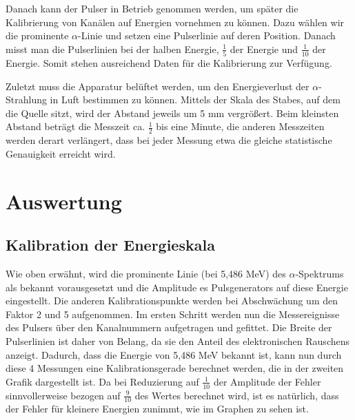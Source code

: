 \documentclass[bigchapter,colorback,accentcolor=tud4b,linedtoc,11pt]{tudreport}
\begin{document}
Danach kann der Pulser in Betrieb genommen werden, um später die Kalibrierung von Kanälen auf Energien vornehmen zu können. Dazu wählen wir die prominente $\alpha$-Linie und setzen eine Pulserlinie auf deren Position. Danach misst man die Pulserlinien bei der halben Energie, $\frac{1}{5}$ der Energie und $\frac{1}{10}$ der Energie. Somit stehen ausreichend Daten für die Kalibrierung zur Verfügung. 

Zuletzt muss die Apparatur belüftet werden, um den Energieverlust der $\alpha$-Strahlung in Luft bestimmen zu können. Mittels der Skala des Stabes, auf dem die Quelle sitzt, wird der Abstand jeweils um 5 mm vergrößert. Beim kleinsten Abstand beträgt die Messzeit ca. $\frac{1}{2}$ bis eine Minute, die anderen Messzeiten werden derart verlängert, dass bei jeder Messung etwa die gleiche statistische Genauigkeit erreicht wird. 

\chapter{Auswertung}

\section{Kalibration der Energieskala}

Wie oben erwähnt, wird die prominente Linie (bei 5,486 MeV) des
$\alpha$-Spektrums als bekannt vorausgesetzt und die Amplitude es Pulsgenerators
auf diese Energie eingestellt. Die anderen Kalibrationspunkte werden bei
Abschwächung um den Faktor 2 und 5 aufgenommen. Im ersten Schritt werden nun die
Messereignisse des Pulsers über den Kanalnummern aufgetragen und gefittet. Die
Breite der Pulserlinien ist daher von Belang, da sie den Anteil des
elektronischen Rauschens anzeigt. Dadurch, dass die Energie von 5,486 MeV
bekannt ist, kann nun durch diese 4 Messungen eine Kalibrationsgerade berechnet
werden, die in der zweiten Grafik dargestellt ist. Da bei Reduzierung auf
$\frac{1}{10}$ der Amplitude der Fehler sinnvollerweise bezogen auf
$\frac{9}{10}$ des Wertes berechnet wird, ist es natürlich, dass der Fehler für
kleinere Energien zunimmt, wie im Graphen zu sehen ist. 



\end{document}
